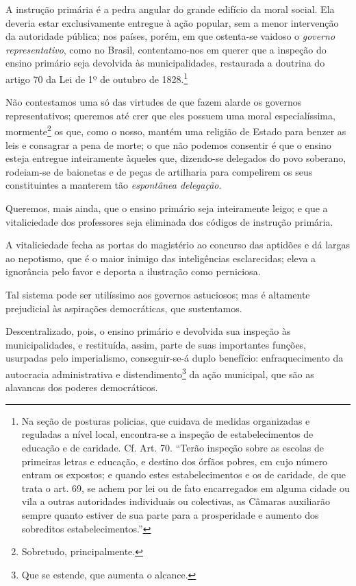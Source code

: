 A instrução primária é a pedra angular do grande edifício da moral
social. Ela deveria estar exclusivamente entregue à ação popular, sem a
menor intervenção da autoridade pública; nos países, porém, em que
ostenta-se vaidoso o \emph{governo representativo}, como no Brasil,
contentamo-nos em querer que a inspeção do ensino primário seja
devolvida às municipalidades, restaurada a doutrina do artigo 70 da Lei
de 1º de outubro de 1828.\footnote{Na seção de posturas policias, que
  cuidava de medidas organizadas e reguladas a nível local, encontra-se
  a inspeção de estabelecimentos de educação e de caridade. Cf. Art. 70.
  ``Terão inspeção sobre as escolas de primeiras letras e educação, e
  destino dos órfãos pobres, em cujo número entram os expostos; e quando
  estes estabelecimentos e os de caridade, de que trata o art. 69, se
  achem por lei ou de fato encarregados em alguma cidade ou vila a
  outras autoridades individuais ou colectivas, as Câmaras auxiliarão
  sempre quanto estiver de sua parte para a prosperidade e aumento dos
  sobreditos estabelecimentos.''}

Não contestamos uma só das virtudes de que fazem alarde os governos
representativos; queremos até crer que eles possuem uma moral
especialíssima, mormente\footnote{Sobretudo, principalmente.} os que,
como o nosso, mantém uma religião de Estado para benzer as leis e
consagrar a pena de morte; o que não podemos consentir é que o ensino
esteja entregue inteiramente àqueles que, dizendo-se delegados do povo
soberano, rodeiam-se de baionetas e de peças de artilharia para
compelirem os seus constituintes a manterem tão \emph{espontânea
delegação}.

Queremos, mais ainda, que o ensino primário seja inteiramente leigo; e
que a vitaliciedade dos professores seja eliminada dos códigos de
instrução primária.

A vitaliciedade fecha as portas do magistério ao concurso das aptidões e
dá largas ao nepotismo, que é o maior inimigo das inteligências
esclarecidas; eleva a ignorância pelo favor e deporta a ilustração como
perniciosa.

Tal sistema pode ser utilíssimo aos governos astuciosos; mas é altamente
prejudicial às aspirações democráticas, que sustentamos.

Descentralizado, pois, o ensino primário e devolvida sua inspeção às
municipalidades, e restituída, assim, parte de suas importantes funções,
usurpadas pelo imperialismo, conseguir-se-á duplo benefício:
enfraquecimento da autocracia administrativa e distendimento\footnote{
  Que se estende, que aumenta o alcance.} da ação municipal, que são as
alavancas dos poderes democráticos.

